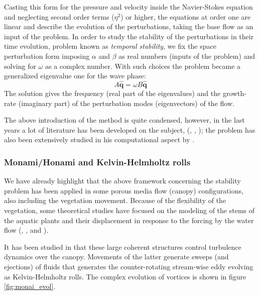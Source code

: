 Casting this form for the pressure and velocity inside the Navier-Stokes equation and neglecting second order terms ($\eta^2$) or higher, the equations at order one are linear and  describe the evolution of the perturbations, taking the base flow as an input of the problem.
In order to study the stability of the perturbations in their time evolution, problem known as \textit{temporal stability}, we fix the space perturbation form imposing $\alpha$ and $\beta$ as real numbers (inputs of the problem) and solving for $\omega$ as a complex number.
With such choices the problem became a generalized eigenvalue one for the wave phase:
$$ A \widehat{\mathbf{q}} =  \omega B\widehat{\mathbf{q}} $$
The solution gives the frequency (real part of the eigenvalues) and the growth-rate (imaginary part) of the perturbation modes (eigenvectors) of the flow.

The above introduction of the method is quite condensed, however, in the last years a lot of literature has been developed on the subject, (\citet{juniper2014modal}, \citet{criminale2003theory}, \citet{schmid2012stability}); the problem has also been extensively studied in his computational aspect by \citet{canuto1988spectral}.

\subsubsection{Monami/Honami and Kelvin-Helmholtz rolls}

We have already highlight that the above framework concerning the stability problem has been applied in some porous media flow (canopy) configurations, also including the vegetation movement.
Because of the flexibility of the vegetation, some theoretical studies have focused on the
modeling of the stems of the aquatic plants and their displacement in response to the forcing by the
water flow (\citet{py2004mixing}, \citet{patil2010characteristics}, \citet{gosselin2009destabilising} and \citet{py2006frequency}).

It has been studied in \citet{finnigan2000turbulence} that these large coherent structures control turbulence dynamics over the canopy. 
Movements of the latter generate sweeps (and ejections) of fluids that generates the counter-rotating stream-wise eddy evolving as Kelvin-Helmholtz rolls.
The complex evolution of vortices is shown in figure \ref{fig:monai_evol}.

